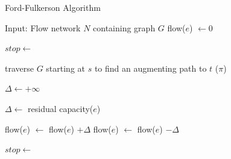 \begin{algorithm}[h]
\caption{Ford-Fulkerson Algorithm}
\label{alg:FordFulkerson}
\begin{algorithmic}
\REQUIRE Input: Flow network $N$ containing graph $G$
 \STATE flow($e$) $\gets 0$
\ENDFOR

\STATE $stop \gets$ \FALSE

\REPEAT
\STATE traverse $G$ starting at $s$ to find an augmenting path to $t$ ($\pi$)


\STATE $\Delta \gets +\infty$

\STATE $\Delta \gets $ residual capacity($e$)
\ENDIF
\ENDFOR


\STATE flow($e$) $\gets $ flow($e$) $+ \Delta$
\ELSE
\STATE flow($e$) $\gets $ flow($e$) $- \Delta$
\ENDIF

\ENDFOR

\ELSE
\STATE $stop \gets$ \TRUE
\ENDIF
{}

\end{algorithmic}
\end{algorithm}

